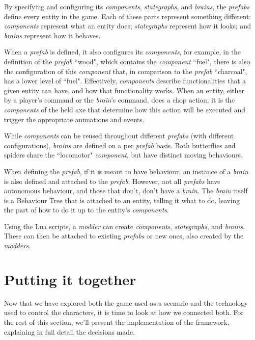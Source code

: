 By specifying and configuring its \textit{components}, \textit{stategraphs}, and \textit{brains}, the \textit{prefabs} define every entity in the game.
Each of these parts represent something different: \textit{components} represent what an entity does; \textit{stategraphs} represent how it looks; and \textit{brains} represent how it behaves.

When a \textit{prefab} is defined, it also configures its \textit{components}, for example, in the definition of the \textit{prefab} ``wood", which contains the \textit{component} ``fuel", there is also the configuration of this \textit{component} that, in comparison to the \textit{prefab} ``charcoal", has a lower level of ``fuel".
Effectively, \textit{components} describe functionalities that a given entity can have, and how that functionality works.
When an entity, either by a player's command or the \textit{brain}'s command, does a chop action, it is the \textit{components} of the held axe that determine how this action will be executed and trigger the appropriate animations and events.

While \textit{components} can be reused throughout different \textit{prefabs} (with different configurations), \textit{brains} are defined on a per \textit{prefab} basis.
Both butterflies and spiders share the ``locomotor" \textit{component}, but have distinct moving behaviours.

When defining the \textit{prefab}, if it is meant to have behaviour, an instance of a \textit{brain} is also defined and attached to the \textit{prefab}.
However, not all \textit{prefabs} have autonomous behaviour, and those that don't, don't have a \textit{brain}.
The \textit{brain} itself is a Behaviour Tree that is attached to an entity, telling it what to do, leaving the part of how to do it up to the entity's \textit{components}.

Using the Lua scripts, a \textit{modder} can create \textit{components}, \textit{stategraphs}, and \textit{brains}.
These can then be attached to existing \textit{prefabs} or new ones, also created by the \textit{modders}.

\section{Putting it together}

Now that we have explored both the game used as a scenario and the technology used to control the characters, it is time to look at how we connected both.
For the rest of this section, we'll present the implementation of the framework, explaining in full detail the decisions made.

